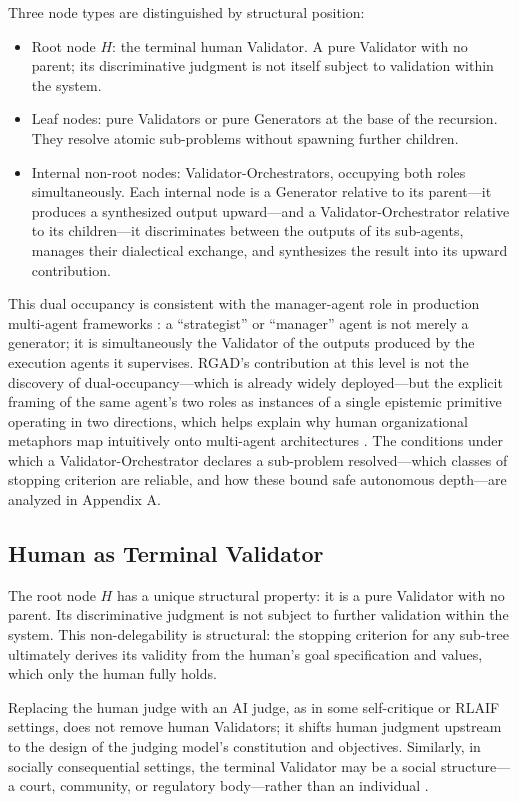 \documentclass[11pt,a4paper]{article}
\begin{document}
Three node types are distinguished by structural position:
\begin{itemize}
  \item Root node $H$: the terminal human Validator. A pure Validator with no parent; its discriminative judgment is not itself subject to validation within the system.
  \item Leaf nodes: pure Validators or pure Generators at the base of the recursion. They resolve atomic sub-problems without spawning further children.
  \item Internal non-root nodes: Validator-Orchestrators, occupying both roles simultaneously. Each internal node is a Generator relative to its parent---it produces a synthesized output upward---and a Validator-Orchestrator relative to its children---it discriminates between the outputs of its sub-agents, manages their dialectical exchange, and synthesizes the result into its upward contribution.
\end{itemize}

This dual occupancy is consistent with the manager-agent role in production multi-agent frameworks \citep{hong2024metagpt}: a ``strategist'' or ``manager'' agent is not merely a generator; it is simultaneously the Validator of the outputs produced by the execution agents it supervises. RGAD's contribution at this level is not the discovery of dual-occupancy---which is already widely deployed---but the explicit framing of the same agent's two roles as instances of a single epistemic primitive operating in two directions, which helps explain why human organizational metaphors map intuitively onto multi-agent architectures \citep{lee2026}. The conditions under which a Validator-Orchestrator declares a sub-problem resolved---which classes of stopping criterion are reliable, and how these bound safe autonomous depth---are analyzed in Appendix A.

\subsection{Human as Terminal Validator}
The root node $H$ has a unique structural property: it is a pure Validator with no parent. Its discriminative judgment is not subject to further validation within the system. This non-delegability is structural: the stopping criterion for any sub-tree ultimately derives its validity from the human's goal specification and values, which only the human fully holds.

Replacing the human judge with an AI judge, as in some self-critique or RLAIF settings, does not remove human Validators; it shifts human judgment upstream to the design of the judging model's constitution and objectives. Similarly, in socially consequential settings, the terminal Validator may be a social structure---a court, community, or regulatory body---rather than an individual \citep{rahwan2017}.
\end{document}
